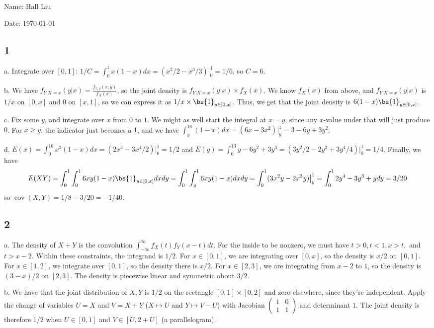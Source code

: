 \documentclass{article}
\newcommand{\openm}{\begin{pmatrix}}
\newcommand{\closem}{\end{pmatrix}}
\DeclareMathOperator{\cov}{cov}
\begin{document}
Name: Hall Liu

Date: \today 
\vspace{1.5cm}

\subsection*{1}
a. Integrate over $[0,1]$: $1/C=\int_0^1x(1-x)dx=(x^2/2-x^3/3)\big|_0^1=1/6$, so $C=6$.

\noindent b. We have $f_{Y|X=x}(y|x)=\frac{f_{x,y}(x,y)}{f_X(x)}$, so the joint density is $f_{Y|X=x}(y|x)\times f_X(x)$. We know $f_X(x)$ from above, and $f_{Y|X=x}(y|x)$ is $1/x$ on $[0,x]$ and $0$ on $[x,1]$, so we can express it as $1/x\times\bs{1}_{y\in[0,x]}$. Thus, we get that the joint density is $6(1-x)\bs{1}_{y\in[0,x]}$.

\noindent c. Fix some $y$, and integrate over $x$ from $0$ to $1$. We might as well start the integral at $x=y$, since any $x$-value under that will just produce $0$. For $x\geq y$, the indicator just becomes a $1$, and we have $\int_y^16(1-x)dx=(6x-3x^2)\big|_y^1=3-6y+3y^2$.

\noindent d. $E(x)=\int_0^16x^2(1-x)dx=(2x^3-3x^4/2)\big|_0^1=1/2$ and $E(y)=\int_0^13y-6y^2+3y^3=(3y^2/2-2y^3+3y^4/4)\big|_0^1=1/4$. Finally, we have 
$$E(XY)=\int_0^1\int_0^16xy(1-x)\bs{1}_{y\in[0,x]}dxdy=\int_0^1\int_y^16xy(1-x)dxdy=\int_0^1(3x^2y-2x^3y)\big|_y^1=\int_0^12y^4-3y^3+ydy=3/20$$
so $\cov(X,Y)=1/8-3/20=-1/40$.
\subsection*{2}
a. The density of $X+Y$ is the convolution $\int_{-\infty}^\infty f_X(t)f_Y(x-t)dt$. For the inside to be nonzero, we must have $t>0,t<1,x>t,$ and $t>x-2$. Within these constraints, the integrand is $1/2$. For $x\in[0,1]$, we are integrating over $[0,x]$, so the density is $x/2$ on $[0,1]$. For $x\in[1,2]$, we integrate over $[0,1]$, so the density there is $x/2$. For $x\in[2,3]$, we are integrating from $x-2$ to $1$, so the density is $(3-x)/2$ on $[2,3]$. The density is piecewise linear and symmetric about $3/2$.

\noindent b. We have that the joint distribution of $X,Y$ is $1/2$ on the rectangle $[0,1]\times[0,2]$ and zero elsewhere, since they're independent. Apply the change of variables $U=X$ and $V=X+Y$ ($X\mapsto U$ and $Y\mapsto V-U$) with Jacobian $\openm1&0\\1&1\closem$ and determinant $1$. The joint density is therefore $1/2$ when $U\in[0,1]$ and $V\in[U,2+U]$ (a parallelogram). 
\end{document}
